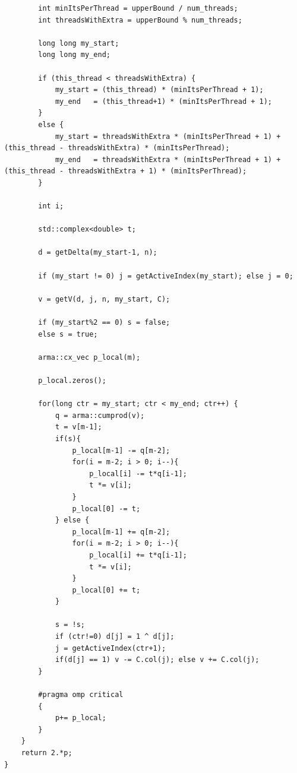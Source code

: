 \documentclass[ %
                    author={Manan Vaswani},
                supervisor={Dr. Raphael Clifford},
                    degree={MEng},
                     title={A multi-core CPU implementation of the classical Boson Sampling algorithm},
                  subtitle={},
                      type={},
                      year={2019} ]{dissertation}
\theoremstyle{plain}
\theoremstyle{definition}
\begin{document}
\begin{verbatim}
		int minItsPerThread = upperBound / num_threads;
		int threadsWithExtra = upperBound % num_threads;

		long long my_start;
		long long my_end;

		if (this_thread < threadsWithExtra) {
			my_start = (this_thread) * (minItsPerThread + 1);
			my_end   = (this_thread+1) * (minItsPerThread + 1);
		}
		else {
			my_start = threadsWithExtra * (minItsPerThread + 1) + (this_thread - threadsWithExtra) * (minItsPerThread);
			my_end   = threadsWithExtra * (minItsPerThread + 1) + (this_thread - threadsWithExtra + 1) * (minItsPerThread);
		}

		int i;

		std::complex<double> t;

		d = getDelta(my_start-1, n);

		if (my_start != 0) j = getActiveIndex(my_start); else j = 0;

		v = getV(d, j, n, my_start, C);

		if (my_start%2 == 0) s = false;
		else s = true;

		arma::cx_vec p_local(m);

		p_local.zeros();

		for(long ctr = my_start; ctr < my_end; ctr++) {
			q = arma::cumprod(v);
			t = v[m-1];
			if(s){
				p_local[m-1] -= q[m-2];
				for(i = m-2; i > 0; i--){
					p_local[i] -= t*q[i-1];
					t *= v[i];
				}
				p_local[0] -= t;
	        } else {
				p_local[m-1] += q[m-2];
				for(i = m-2; i > 0; i--){
					p_local[i] += t*q[i-1];
					t *= v[i];
				}
				p_local[0] += t;
			}

			s = !s;
			if (ctr!=0) d[j] = 1 ^ d[j];
			j = getActiveIndex(ctr+1);
			if(d[j] == 1) v -= C.col(j); else v += C.col(j);
		}

		#pragma omp critical
		{
			p+= p_local;
		}
	}
	return 2.*p;
}
\end{verbatim}
\end{document}
